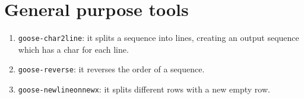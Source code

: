 \chapter{General purpose tools}
\label{seq}

\begin{enumerate}
\item \texttt{goose-char2line}: it splits a sequence into lines, creating an output sequence which has a char for each line.
\item \texttt{goose-reverse}: it reverses the order of a sequence.
\item \texttt{goose-newlineonnewx}: it splits different rows with a new empty row.
\end{enumerate}

%
%

%
%
%
%
%
%

%
%
%
%
